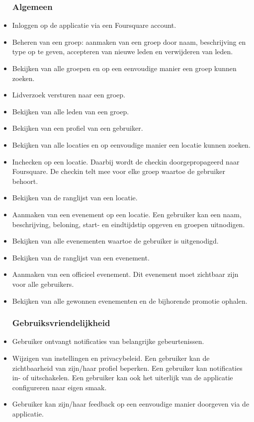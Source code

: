 \begin{itemize}
	
\subsubsection{Algemeen}
\item Inloggen op de applicatie via een Foursquare account.
\item Beheren van een groep: aanmaken van een groep door naam, beschrijving en type op te geven, accepteren van nieuwe leden en verwijderen van leden.   
\item Bekijken van alle groepen en op een eenvoudige manier een groep kunnen zoeken.
\item Lidverzoek versturen naar een groep.
\item Bekijken van alle leden van een groep.
\item Bekijken van een profiel van een gebruiker.
\item Bekijken van alle locaties en op eenvoudige manier een locatie kunnen zoeken.
\item Inchecken op een locatie. Daarbij wordt de checkin doorgepropageerd naar Foursquare. De checkin telt mee voor elke groep waartoe de gebruiker behoort. 
\item Bekijken van de ranglijst van een locatie.
\item Aanmaken van een evenement op een locatie. Een gebruiker kan een naam, beschrijving, beloning, start- en eindtijdstip opgeven en groepen uitnodigen.
\item Bekijken van alle evenementen waartoe de gebruiker is uitgenodigd.
\item Bekijken van de ranglijst van een evenement.
\item Aanmaken van een officieel evenement. Dit evenement moet zichtbaar zijn voor alle gebruikers.
\item Bekijken van alle gewonnen evenementen en de bijhorende promotie ophalen.

\subsubsection{Gebruiksvriendelijkheid}

\item Gebruiker ontvangt notificaties van belangrijke gebeurtenissen.
\item Wijzigen van instellingen en privacybeleid. Een gebruiker kan de zichtbaarheid van zijn/haar profiel beperken. Een gebruiker kan notificaties in- of uitschakelen. Een gebruiker kan ook het uiterlijk van de applicatie configureren naar eigen smaak.
\item Gebruiker kan zijn/haar feedback  op een eenvoudige manier doorgeven via de applicatie.

\end{itemize}

